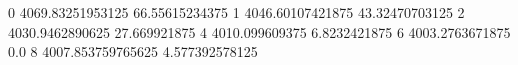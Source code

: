 0 4069.83251953125 66.55615234375
1 4046.60107421875 43.32470703125
2 4030.9462890625 27.669921875
4 4010.099609375 6.8232421875
6 4003.2763671875 0.0
8 4007.853759765625 4.577392578125
